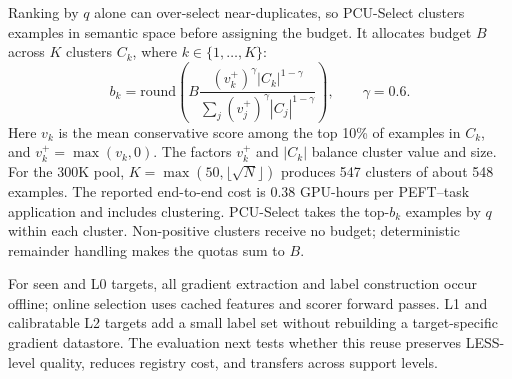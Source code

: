 Ranking by $q$ alone can over-select near-duplicates, so PCU-Select clusters examples in semantic space before assigning the budget. It allocates budget $B$ across $K$ clusters $C_k$, where $k\in\{1,\ldots,K\}$:
\begin{equation}
  b_k=\mathrm{round}\!\left(
  B\frac{(v_k^{+})^{\gamma}|C_k|^{1-\gamma}}
  {\sum_j(v_j^{+})^{\gamma}|C_j|^{1-\gamma}}\right),\qquad \gamma=0.6.
  \label{eq:quota}
\end{equation}
Here $v_k$ is the mean conservative score among the top 10\% of examples in $C_k$, and $v_k^{+}=\max(v_k,0)$. The factors $v_k^{+}$ and $|C_k|$ balance cluster value and size. For the 300K pool, $K=\max(50,\lfloor\sqrt{N}\rfloor)$ produces 547 clusters of about 548 examples. The reported end-to-end cost is 0.38 GPU-hours per PEFT--task application and includes clustering. PCU-Select takes the top-$b_k$ examples by $q$ within each cluster. Non-positive clusters receive no budget; deterministic remainder handling makes the quotas sum to $B$.

For seen and L0 targets, all gradient extraction and label construction occur offline; online selection uses cached features and scorer forward passes. L1 and calibratable L2 targets add a small label set without rebuilding a target-specific gradient datastore. The evaluation next tests whether this reuse preserves LESS-level quality, reduces registry cost, and transfers across support levels.
